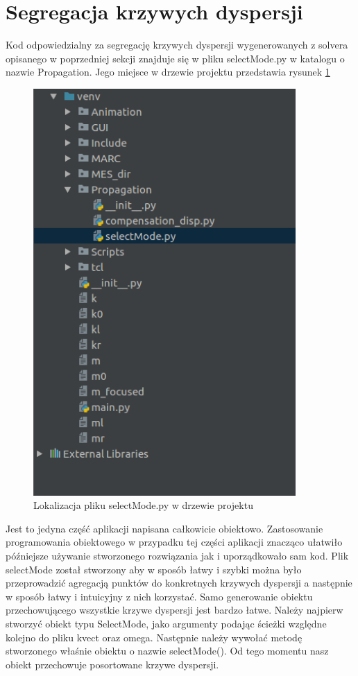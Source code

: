 \section{Segregacja krzywych dyspersji}
Kod odpowiedzialny za segregację krzywych dyspersji wygenerowanych z solvera opisanego w poprzedniej sekcji znajduje się w pliku selectMode.py w katalogu o nazwie Propagation. Jego miejsce w drzewie projektu przedstawia rysunek \ref{fig:gdzie jest select}
\begin{figure}[h]
\centering
\includegraphics[width=10cm]{Zdjecia/5/kasia/selectMode}
\caption{Lokalizacja pliku selectMode.py w drzewie projektu}
\label{fig:gdzie jest select}
\end{figure}
Jest to jedyna część aplikacji napisana całkowicie obiektowo. Zastosowanie programowania obiektowego w przypadku tej części aplikacji znacząco ułatwiło późniejsze używanie stworzonego rozwiązania jak i uporządkowało sam kod. Plik selectMode został stworzony aby w sposób łatwy i szybki można było przeprowadzić agregacją punktów do konkretnych krzywych dyspersji a następnie w sposób łatwy i intuicyjny z nich korzystać. Samo generowanie obiektu przechowującego wszystkie krzywe dyspersji jest bardzo łatwe. Należy najpierw stworzyć obiekt typu SelectMode, jako argumenty podając ścieżki względne kolejno do pliku kvect oraz omega. Następnie należy wywołać metodę stworzonego właśnie obiektu o nazwie selectMode(). Od tego momentu nasz obiekt przechowuje posortowane krzywe dyspersji.


